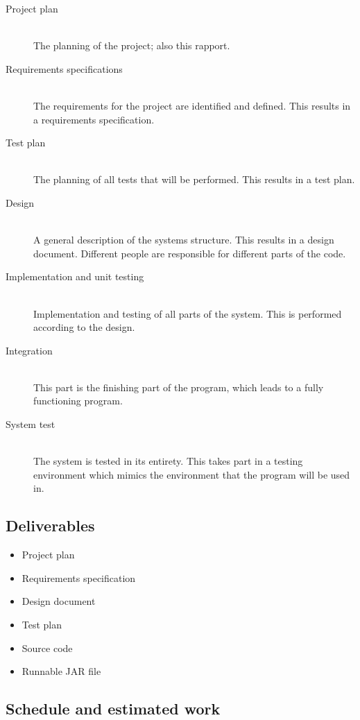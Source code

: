 \documentclass[12pt,titlepage]{article}
\begin{document}
\begin{description}
	\item[Project plan] \hfill \\
		The planning of the project; also this rapport.
	\item[Requirements specifications] \hfill \\
		The requirements for the project are identified and defined.
		This results in a requirements specification.
	\item[Test plan] \hfill \\
		The planning of all tests that will be performed.
		This results in a test plan.
	\item[Design] \hfill \\
		A general description of the systems structure.
		This results in a design document.
		Different people are responsible for different parts of the
		code.
	\item[Implementation and unit testing] \hfill \\
		Implementation and testing of all parts of the system.
		This is performed according to the design.
	\item[Integration] \hfill \\
		This part is the finishing part of the program,
		which leads to a fully functioning program.
	\item[System test] \hfill \\
		The system is tested in its entirety. This takes part in a
		testing environment which mimics the environment that the
		program will be used in.
\end{description}

\subsection{Deliverables}

\begin{itemize}
	\item Project plan
	\item Requirements specification
	\item Design document
	\item Test plan
	\item Source code
	\item Runnable JAR file
\end{itemize}

\subsection{Schedule and estimated work}
\end{document}
